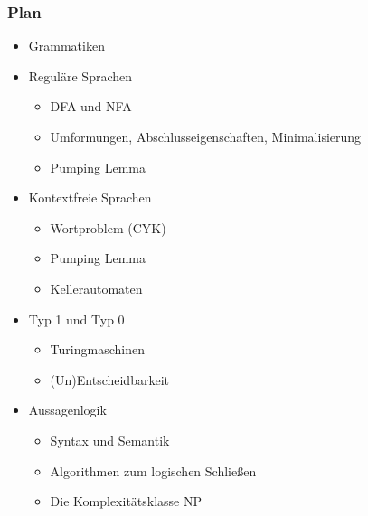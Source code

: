 \documentclass[aspectratio=1610,onlymath]{beamer}
\begin{document}
\maketitle



\begin{frame}\frametitle{Plan}

\begin{itemize}
\item \alert{Grammatiken}
\item \alert{Reguläre Sprachen}
\begin{itemize}
\item DFA und NFA
\item Umformungen, Abschlusseigenschaften, Minimalisierung
\item Pumping Lemma
\end{itemize}
\item \alert{Kontextfreie Sprachen}
\begin{itemize}
\item Wortproblem (CYK)
\item Pumping Lemma
\item Kellerautomaten
\end{itemize}\pause
\item \alert{Typ 1 und Typ 0}
\begin{itemize}
\item Turingmaschinen
\item (Un)Entscheidbarkeit
\end{itemize}
\item \alert{Aussagenlogik}
\begin{itemize}
\item Syntax und Semantik
\item Algorithmen zum logischen Schließen
\item Die Komplexitätsklasse NP
\end{itemize}
\end{itemize}

\end{frame}

\end{document}
